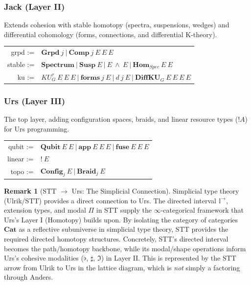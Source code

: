 \documentclass{article}
\theoremstyle{definition}
\newtheorem{remark}[definition]{Remark}
\theoremstyle{plain}
\begin{document}
\subsubsection{Jack (Layer II)}
Extends cohesion with stable homotopy (spectra, suspensions, wedges) and differential cohomology (forms, connections, and differential K-theory).
\begin{table}[ht!]
\centering
\begin{tabular}{rl}
    grpd :=&$\textbf{Grpd}\ j\ |\ \textbf{Comp}\ j\ E\ E\ E$ \\
  stable :=&$\textbf{Spectrum}\ |\ \textbf{Susp}\ E\ |\ E\ \wedge\ E\ |\ \textbf{Hom}_{Spec}\ E\ E$ \\
      ku :=&$KU_G^{\tau}\ E\ E\ E\ |\ \textbf{forms}\ j\ E\ |\ d\ j\ E\ |\ \textbf{DiffKU}_G\ E\ E\ E\ E$ \\
\end{tabular}
\end{table}

\subsubsection{Urs (Layer III)}
The top layer, adding configuration spaces, braids, and linear resource types ($!A$) for Urs programming.
\begin{table}[ht!]
\centering
\begin{tabular}{rl}
   qubit :=&$\textbf{Qubit}\ E\ E\ |\ \textbf{app}\ E\ E\ E\ |\ \textbf{fuse}\ E\ E\ E$ \\
  linear :=&$!\ E$ \\
    topo :=&$\textbf{Config}_j\ E\ |\ \textbf{Braid}_j\ E$ \\
\end{tabular}
\end{table}

\begin{remark}[STT $\to$ Urs: The Simplicial Connection]
Simplicial type theory (Ulrik/STT) provides a direct connection to Urs.
The directed interval $\mathbb{I}^{\to}$, extension types, and modal
$\Pi$ in STT supply the $\infty$-categorical framework that Urs's Layer I
(Homotopy) builds upon. By isolating the category of categories $\mathbf{Cat}$ as a reflective subuniverse in simplicial type theory, STT provides the required directed homotopy structures. Concretely, STT's directed interval becomes the path/homotopy backbone, while its modal/shape operations inform Urs's cohesive modalities ($\flat$, $\sharp$, $\Im$) in Layer II\@. This is represented by the $\mathrm{STT}$ arrow from Ulrik to Urs in the lattice diagram, which is \emph{not} simply a factoring through Anders.
\end{remark}
\end{document}
